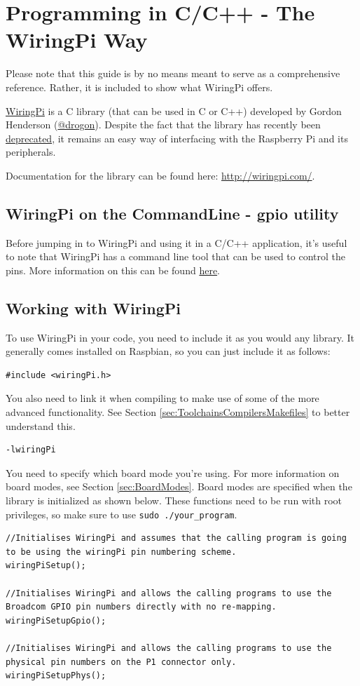 \section{Programming in C/C++ - The WiringPi Way}
\label{app:C/C++}
Please note that this guide is by no means meant to serve as a comprehensive reference. Rather, it is included to show what WiringPi offers.

\href{http://wiringpi.com}{WiringPi} is a C library (that can be used in C or C++) developed by Gordon Henderson (\href{https://twitter.com/drogon}{@drogon}). Despite the fact that the library has recently been \href{http://wiringpi.com/wiringpi-deprecated/}{deprecated}, it remains an easy way of interfacing with the Raspberry Pi and its peripherals. 

Documentation for the library can be found here: \href{http://wiringpi.com/}{http://wiringpi.com/}.

\subsection{WiringPi on the CommandLine - gpio utility}
Before jumping in to WiringPi and using it in a C/C++ application, it's useful to note that WiringPi has a command line tool that can be used to control the pins. More information on this can be found \href{http://wiringpi.com/the-gpio-utility/}{here}.


\subsection{Working with WiringPi}
To use WiringPi in your code, you need to include it as you would any library. It generally comes installed on Raspbian, so you can just include it as follows:
\begin{lstlisting}
#include <wiringPi.h>
\end{lstlisting}

You also need to link it when compiling to make use of some of the more advanced functionality. See Section \ref{sec:ToolchainsCompilersMakefiles} to better understand this.
\begin{lstlisting}
-lwiringPi
\end{lstlisting}

You need to specify which board mode you're using. For more information on board modes, see Section \ref{sec:BoardModes}. Board modes are specified when  the library is initialized as shown below. These functions need to be run with root privileges, so make sure to use \verb|sudo ./your_program|. 
\begin{lstlisting}
//Initialises WiringPi and assumes that the calling program is going to be using the wiringPi pin numbering scheme.
wiringPiSetup();

//Initialises WiringPi and allows the calling programs to use the Broadcom GPIO pin numbers directly with no re-mapping.
wiringPiSetupGpio();

//Initialises WiringPi and allows the calling programs to use the physical pin numbers on the P1 connector only.
wiringPiSetupPhys();
\end{lstlisting}

